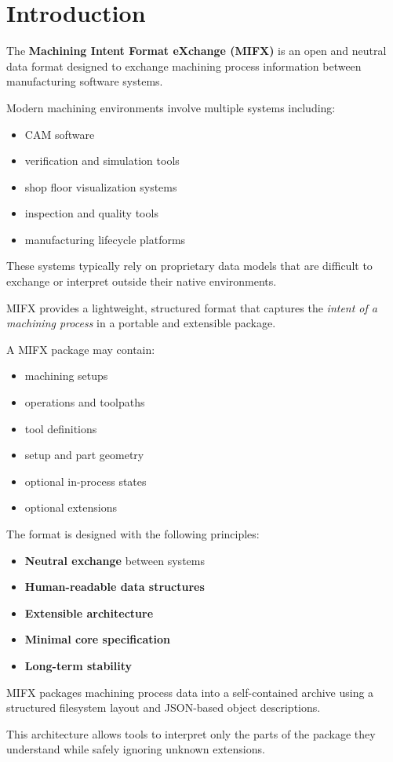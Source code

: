 \section{Introduction}

The \textbf{Machining Intent Format eXchange (MIFX)} is an open and neutral data format designed to exchange machining process information between manufacturing software systems.

Modern machining environments involve multiple systems including:

\begin{itemize}
\item CAM software
\item verification and simulation tools
\item shop floor visualization systems
\item inspection and quality tools
\item manufacturing lifecycle platforms
\end{itemize}

These systems typically rely on proprietary data models that are difficult to exchange or interpret outside their native environments.

MIFX provides a lightweight, structured format that captures the \textit{intent of a machining process} in a portable and extensible package.

A MIFX package may contain:

\begin{itemize}
\item machining setups
\item operations and toolpaths
\item tool definitions
\item setup and part geometry
\item optional in-process states
\item optional extensions
\end{itemize}

The format is designed with the following principles:

\begin{itemize}
\item \textbf{Neutral exchange} between systems
\item \textbf{Human-readable data structures}
\item \textbf{Extensible architecture}
\item \textbf{Minimal core specification}
\item \textbf{Long-term stability}
\end{itemize}

MIFX packages machining process data into a self-contained archive using a structured filesystem layout and JSON-based object descriptions.

This architecture allows tools to interpret only the parts of the package they understand while safely ignoring unknown extensions.